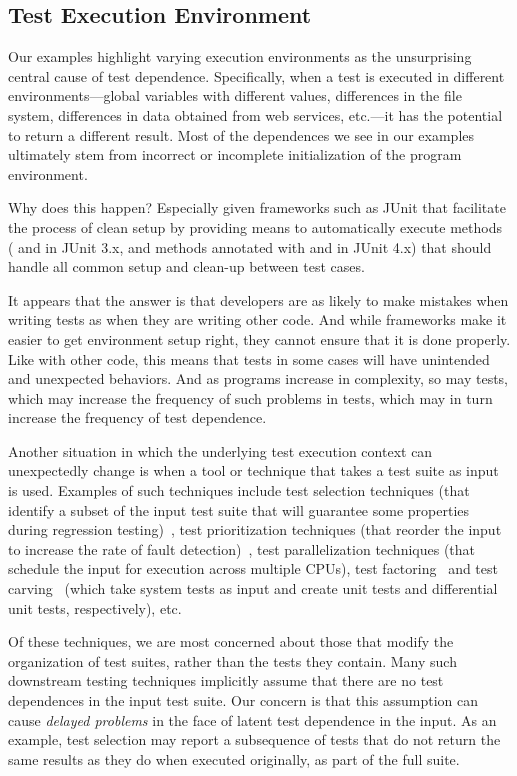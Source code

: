\subsection{Test Execution Environment}

Our examples highlight varying execution environments as the
unsurprising central cause of test dependence. Specifically, when a
test is executed in different environments---global variables
with different values, differences in the file system, differences in
data obtained from web services, etc.---it has the potential to return
a different result.  
Most of the dependences we see in our
examples ultimately stem from incorrect or incomplete initialization
of the program environment.

Why does this happen? Especially given frameworks such as
JUnit that facilitate the process of clean setup by providing means to
automatically execute methods ( and  in JUnit
3.x, and methods annotated with  and  in
JUnit 4.x) that should handle all common setup and clean-up between
test cases. 

It appears that the answer is that developers are as likely
to make mistakes when writing tests as when they are writing other code.
And while frameworks make it easier to get environment setup right, 
they cannot ensure that it is done properly. 
Like with other code, this means that tests in some cases will have
unintended and unexpected behaviors.  And as programs increase in complexity,
so may tests, which may increase the frequency of such problems in tests,
which may in turn increase the frequency of test dependence.

Another situation in which the underlying test execution context can
unexpectedly change is when a tool or technique that takes a test
suite as input is used.  Examples of such techniques include
test selection techniques (that identify a subset of
the input test suite that will guarantee some properties during
regression testing)~\cite{harroldetal:OOPSLA:2001}, test prioritization techniques (that reorder the
input to increase the rate of fault detection)~\cite{Elbaum:2000:PTC:347324.348910}, test parallelization
techniques (that schedule the input for execution across multiple
CPUs), test factoring~\cite{Saff:2005} and test carving~\cite{Elbaum:2006} (which take system tests as
input and create unit tests and differential unit tests,
respectively), etc. 

Of these techniques, we are most concerned about
those that modify the organization of test suites, rather than the tests
they contain.
Many such downstream testing techniques implicitly assume that
there are no test dependences in the input test suite.  Our concern is
that this assumption can cause \emph{delayed problems} in the face
of latent test dependence in the input.  As an
example, test selection may report a subsequence of tests that do not
return the same results as they do when executed originally, as part of the full suite.

